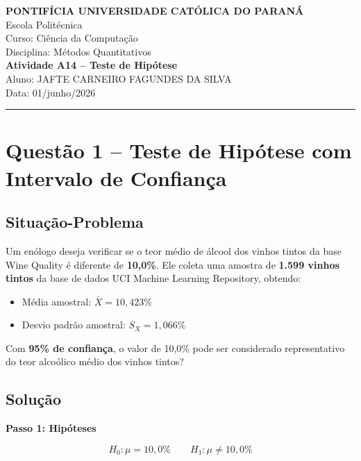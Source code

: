 \documentclass[12pt,a4paper]{article}
\begin{document}
\begin{center}
  {\large \textbf{PONTIFÍCIA UNIVERSIDADE CATÓLICA DO PARANÁ}} \\[4pt]
  Escola Politécnica \\
  Curso: Ciência da Computação \\
  Disciplina: Métodos Quantitativos \\[10pt]
  {\large \textbf{Atividade A14 -- Teste de Hipótese}} \\[4pt]
  Aluno: JAFTE CARNEIRO FAGUNDES DA SILVA \\
  Data: 01/junho/2026
\end{center}

\vspace{0.5cm}
\hrule
\vspace{0.8cm}

\section*{Questão 1 -- Teste de Hipótese com Intervalo de Confiança}

\subsection*{Situação-Problema}

Um enólogo deseja verificar se o teor médio de álcool dos vinhos tintos da base
Wine Quality é diferente de \textbf{10,0\%}. Ele coleta uma amostra de
\textbf{1.599 vinhos tintos} da base de dados UCI Machine Learning Repository,
obtendo:

\begin{itemize}
  \item Média amostral: $\bar{X} = 10{,}423\%$
  \item Desvio padrão amostral: $S_X = 1{,}066\%$
\end{itemize}

Com \textbf{95\% de confiança}, o valor de 10,0\% pode ser considerado
representativo do teor alcoólico médio dos vinhos tintos?

\subsection*{Solução}

\textbf{Passo 1: Hipóteses}

\[
  H_0: \mu = 10{,}0\% \qquad H_1: \mu \neq 10{,}0\%
\]
\end{document}
